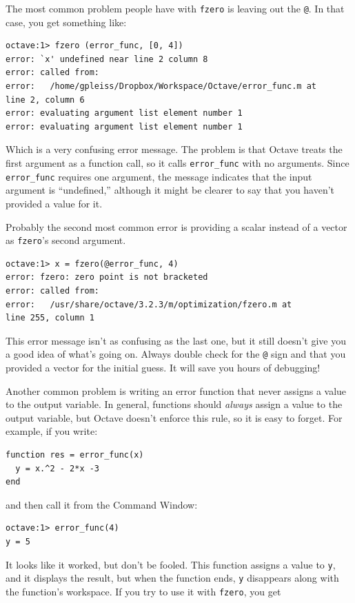 \documentclass{book}
\begin{document}
The most common problem people have with {\tt fzero} is leaving
out the {\tt @}. In that case, you get something like:

\begin{verbatim}
octave:1> fzero (error_func, [0, 4])
error: `x' undefined near line 2 column 8
error: called from:
error:   /home/gpleiss/Dropbox/Workspace/Octave/error_func.m at 
line 2, column 6
error: evaluating argument list element number 1
error: evaluating argument list element number 1
\end{verbatim}

Which is a very confusing error message. The problem is that Octave
treats the first argument as a function call, so it calls {\tt error\_func}
with no arguments. Since {\tt error\_func} requires one argument, the
message indicates that the input argument is ``undefined,'' although
it might be clearer to say that you haven't provided a value for it.

Probably the second most common error is providing a scalar instead of a vector
as {\tt fzero}'s second argument.

\begin{verbatim}
octave:1> x = fzero(@error_func, 4)
error: fzero: zero point is not bracketed
error: called from:
error:   /usr/share/octave/3.2.3/m/optimization/fzero.m at 
line 255, column 1
\end{verbatim}
 
This error message isn't as confusing as the last one, but it still doesn't
give you a good idea of what's going on. Always double check for the {\tt @}
sign and that you provided a vector for the initial guess. It will save you
hours of debugging!

Another common problem is writing an error function that never
assigns a value to the output variable. In general, functions should
{\em always} assign a value to the output variable, but Octave doesn't
enforce this rule, so it is easy to forget. For example, if you
write:

\begin{verbatim}
function res = error_func(x)
  y = x.^2 - 2*x -3
end
\end{verbatim}

and then call it from the Command Window:

\begin{verbatim}
octave:1> error_func(4)
y = 5
\end{verbatim}

It looks like it worked, but don't be fooled. This function assigns
a value to {\tt y}, and it displays the result, but when the function
ends, {\tt y} disappears along with the function's workspace.
If you try to use it with {\tt fzero}, you get
\end{document}

